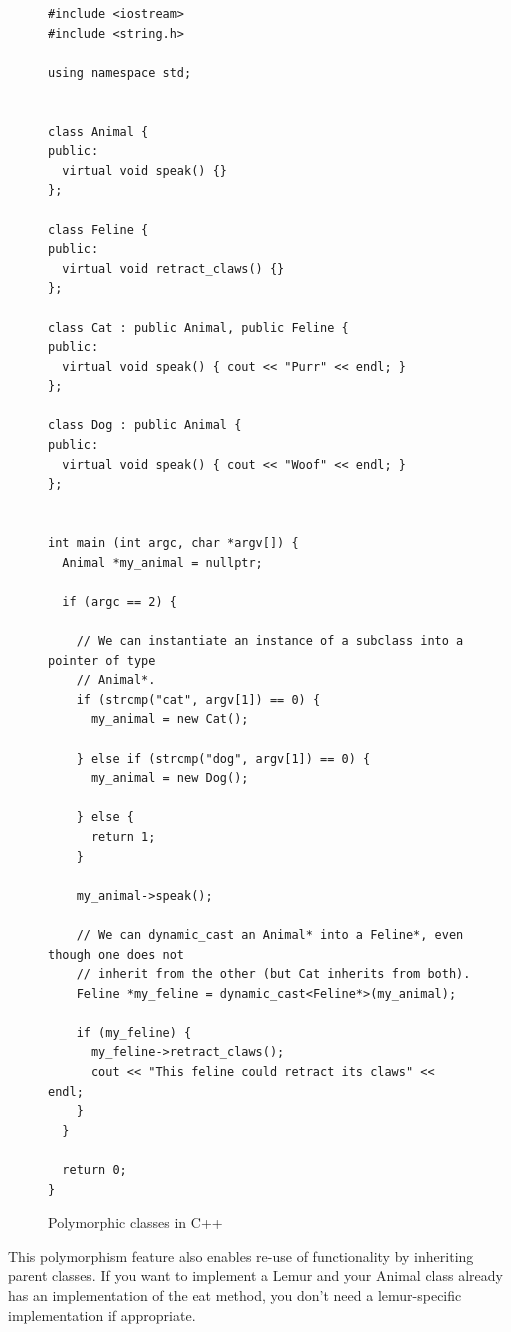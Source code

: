 \documentclass[a4paper,11pt,oneside]{report}
\begin{document}
\begin{figure}[h]
\begin{lstlisting}
#include <iostream>
#include <string.h>

using namespace std;


class Animal {
public:
  virtual void speak() {}
};

class Feline {
public:
  virtual void retract_claws() {}
};

class Cat : public Animal, public Feline {
public:
  virtual void speak() { cout << "Purr" << endl; }
};

class Dog : public Animal {
public:
  virtual void speak() { cout << "Woof" << endl; }
};


int main (int argc, char *argv[]) {
  Animal *my_animal = nullptr;

  if (argc == 2) {

    // We can instantiate an instance of a subclass into a pointer of type
    // Animal*.
    if (strcmp("cat", argv[1]) == 0) {
      my_animal = new Cat();

    } else if (strcmp("dog", argv[1]) == 0) {
      my_animal = new Dog();

    } else {
      return 1;
    }

    my_animal->speak();

    // We can dynamic_cast an Animal* into a Feline*, even though one does not
    // inherit from the other (but Cat inherits from both).
    Feline *my_feline = dynamic_cast<Feline*>(my_animal);

    if (my_feline) {
      my_feline->retract_claws();
      cout << "This feline could retract its claws" << endl;
    }
  }

  return 0;
}
\end{lstlisting}
\caption{Polymorphic classes in C++}
\label{classes}

\end{figure}

This polymorphism feature also enables re-use of functionality by inheriting 
parent classes.
If you want to implement a Lemur and your Animal class already has an 
implementation of the eat method,
you don't need a lemur-specific implementation if appropriate. 
\end{document}

